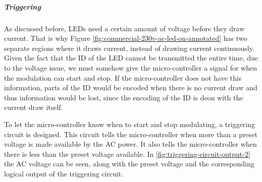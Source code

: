 
\subparagraph{Triggering}

	As discussed before, LEDs need a certain amount of voltage before they draw current.
	That is why Figure \ref{fig:commercial-230v-ac-led-on-annotated} has two separate regions where it draws current, instead of drawing current continuously.
	Given the fact that the ID of the LED cannot be transmitted the entire time, due to the voltage issue, we must somehow give the micro-controller a signal for when the modulation can start and stop.
	If the micro-controller does not have this information, parts of the ID would be encoded when there is no current draw and thus information would be lost, since the encoding of the ID is deon with the current draw itself.

	To let the micro-controller know when to start and stop modulating, a triggering circuit is designed.
	This circuit tells the micro-controller when more than a preset voltage is made available by the AC power.
	It also tells the micro-controller when there is less than the preset voltage available.
	In \autoref{fig:triggering-circuit-output-2} the AC voltage can be seen, along with the preset voltage and the corresponding logical output of the triggering circuit.



